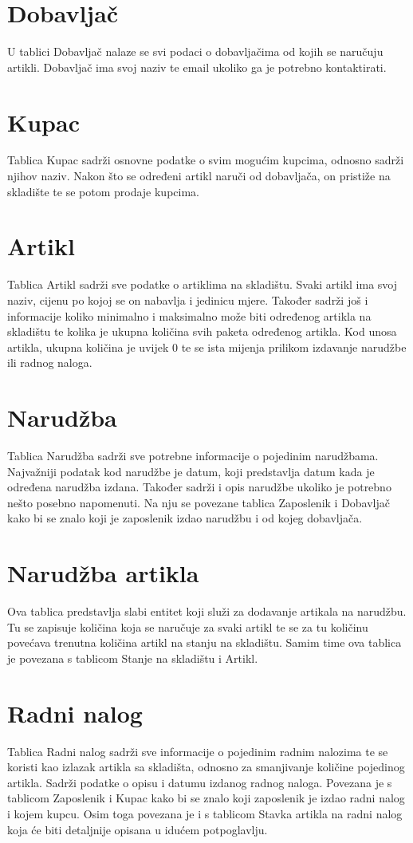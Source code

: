 \documentclass{foi}
\begin{document}
\section{Dobavljač}
U tablici Dobavljač nalaze se svi podaci o dobavljačima od kojih se naručuju artikli. Dobavljač ima svoj naziv te email ukoliko ga je potrebno kontaktirati.

\section{Kupac}
Tablica Kupac sadrži osnovne podatke o svim mogućim kupcima, odnosno sadrži njihov naziv. Nakon što se određeni artikl naruči od dobavljača, on pristiže na skladište te se potom prodaje kupcima. 

\section{Artikl}
Tablica Artikl sadrži sve podatke o artiklima na skladištu. Svaki artikl ima svoj naziv, cijenu po kojoj se on nabavlja i jedinicu mjere. Također sadrži još i informacije koliko minimalno i maksimalno može biti određenog artikla na skladištu te kolika je ukupna količina svih paketa određenog artikla. Kod unosa artikla, ukupna količina je uvijek 0 te se ista mijenja prilikom izdavanje narudžbe ili radnog naloga.

\section{Narudžba}
Tablica Narudžba sadrži sve potrebne informacije o pojedinim narudžbama. Najvažniji podatak kod narudžbe je datum, koji predstavlja datum kada je određena narudžba izdana. Također sadrži i opis narudžbe ukoliko je potrebno nešto posebno napomenuti. Na nju se povezane tablica Zaposlenik i Dobavljač kako bi se znalo koji je zaposlenik izdao narudžbu i od kojeg dobavljača.

\section{Narudžba artikla}
Ova tablica predstavlja slabi entitet koji služi za dodavanje artikala na narudžbu. Tu se zapisuje količina koja se naručuje za svaki artikl te se za tu količinu povećava trenutna količina artikl na stanju na skladištu. Samim time ova tablica je povezana s tablicom Stanje na skladištu i Artikl.

\section{Radni nalog}
Tablica Radni nalog sadrži sve informacije o pojedinim radnim nalozima te se koristi kao izlazak artikla sa skladišta, odnosno za smanjivanje količine pojedinog artikla. Sadrži podatke o opisu i datumu izdanog radnog naloga. Povezana je s tablicom Zaposlenik i Kupac kako bi se znalo koji zaposlenik je izdao radni nalog i kojem kupcu. Osim toga povezana je i s tablicom Stavka artikla na radni nalog koja će biti detaljnije opisana u idućem potpoglavlju. 
\end{document}
